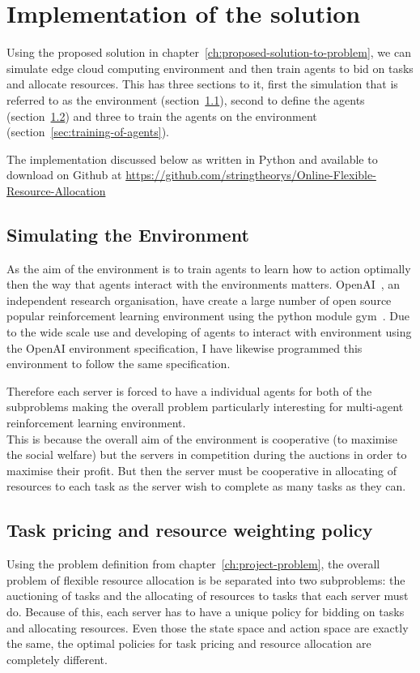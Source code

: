 \chapter{Implementation of the solution}\label{ch:implementation-of-the-solution}
Using the proposed solution in chapter~\ref{ch:proposed-solution-to-problem}, we can simulate edge cloud computing
environment and then train agents to bid on tasks and allocate resources. This has three sections to it, first the
simulation that is referred to as the environment (section~\ref{sec:simulating-the-environment}),
second to define the agents (section~\ref{sec:agent-definition}) and three to train the agents on the
environment (section~\ref{sec:training-of-agents}).

The implementation discussed below as written in Python and available to download on Github at
\url{https://github.com/stringtheorys/Online-Flexible-Resource-Allocation}

\section{Simulating the Environment}\label{sec:simulating-the-environment}
As the aim of the environment is to train agents to learn how to action optimally then the way that agents
interact with the environments matters. OpenAI~\cite{}, an independent research organisation, have create a large
number of open source popular reinforcement learning environment using the python module gym~\cite{}.
Due to the wide scale use and developing of agents to interact with environment using the OpenAI environment
specification, I have likewise programmed this environment to follow the same specification. %

Therefore each server is forced to have a individual agents for both of the subproblems making the overall problem
particularly interesting for multi-agent reinforcement learning environment. \\
This is because the overall aim of the environment is cooperative (to maximise the social welfare) but the servers
in competition during the auctions in order to maximise their profit.
But then the server must be cooperative in allocating of resources to each task as the server wish to complete as
many tasks as they can.

\section{Task pricing and resource weighting policy}\label{sec:agent-definition}
Using the problem definition from chapter~\ref{ch:project-problem}, the overall problem of flexible resource allocation
is be separated into two subproblems: the auctioning of tasks and the allocating of resources to tasks that each server
must do. Because of this, each server has to have a unique policy for bidding on tasks and allocating resources.
Even those the state space and action space are exactly the same, the optimal policies for task pricing and
resource allocation are completely different.

